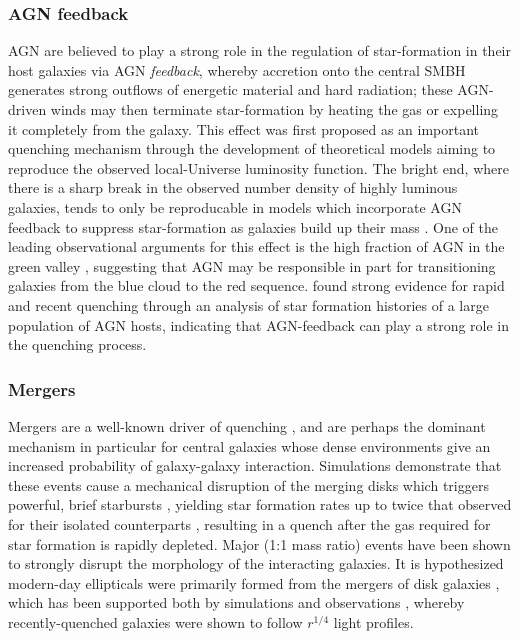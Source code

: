 \subsubsection{AGN feedback}
AGN are believed to play a strong role in the regulation of star-formation in their host galaxies via AGN \emph{feedback}, whereby accretion onto the central SMBH generates strong outflows of energetic material and hard radiation; these AGN-driven winds may then terminate star-formation by heating the gas or expelling it completely from the galaxy. This effect was first proposed as an important quenching mechanism through the development of theoretical models aiming to reproduce the observed local-Universe luminosity function. The bright end, where there is a sharp break in the observed number density of highly luminous galaxies, tends to only be reproducable in models which incorporate AGN feedback to suppress star-formation as galaxies build up their mass \citep{Benson2003, DiMatteo2005, Bower2006, Croton2006, Somerville2008}. One of the leading observational arguments for this effect is the high fraction of AGN in the green valley \citep{Martin2007a,Schawinski2010}, suggesting that AGN may be responsible in part for transitioning galaxies from the blue cloud to the red sequence. \citet{Smethurst2016} found strong evidence for rapid and recent quenching through an analysis of star formation histories of a large population of AGN hosts, indicating that AGN-feedback can play a strong role in the quenching process.  

\subsubsection{Mergers}
Mergers are a well-known driver of quenching \citep{Peng2010}, and are perhaps the dominant mechanism in particular for central galaxies \citep{Smethurst2017} whose dense environments give an increased probability of galaxy-galaxy interaction. Simulations demonstrate that these events cause a mechanical disruption of the merging disks \citep{Pontzen2017} which triggers powerful, brief starbursts \citep{Barnes1996,Hopkins2006}, yielding star formation rates up to twice that observed for their isolated counterparts \citep{Mihos1994}, resulting in a quench after the gas required for star formation is rapidly depleted. Major (1:1 mass ratio) events have been shown to strongly disrupt the morphology of the interacting galaxies. It is hypothesized modern-day ellipticals were primarily formed from the mergers of disk galaxies \citep{Toomre1977,Schweizer1982,Schweizer1990}, which has been supported both by simulations \citep{Mihos1996,Pontzen2017} and observations \citep{Schweizer1982,Wright1990,Stanford1991}, whereby recently-quenched galaxies were shown to follow $r^{1/4}$ light profiles. 


